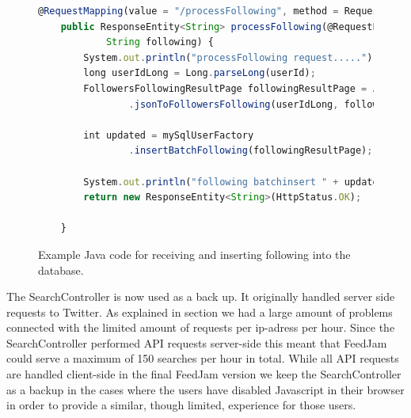 \begin{figure}[h!]
\begin{lstlisting}[language=javascript]
@RequestMapping(value = "/processFollowing", method = RequestMethod.POST)
	public ResponseEntity<String> processFollowing(@RequestParam String userId,
			String following) {
		System.out.println("processFollowing request.....");
		long userIdLong = Long.parseLong(userId);
		FollowersFollowingResultPage followingResultPage = JsonUserParser
				.jsonToFollowersFollowing(userIdLong, following);

		int updated = mySqlUserFactory
				.insertBatchFollowing(followingResultPage);

		System.out.println("following batchinsert " + updated);
		return new ResponseEntity<String>(HttpStatus.OK);

	}
\end{lstlisting}
\caption{Example Java code for receiving and inserting following into the database.}
\label{javaProcessFollowing}
\end{figure}

The SearchController is now used as a back up. It originally handled server side requests to Twitter. As explained in section \label{twitterProblem} we had a large amount of problems connected with the limited amount of requests per ip-adress per hour. Since the SearchController performed API requests server-side this meant that FeedJam could serve a maximum of 150 searches per hour in total. While all API requests are handled client-side in the final FeedJam version we keep the SearchController as a backup in the cases where the users have disabled Javascript in their browser in order to provide a similar, though limited, experience for those users.


